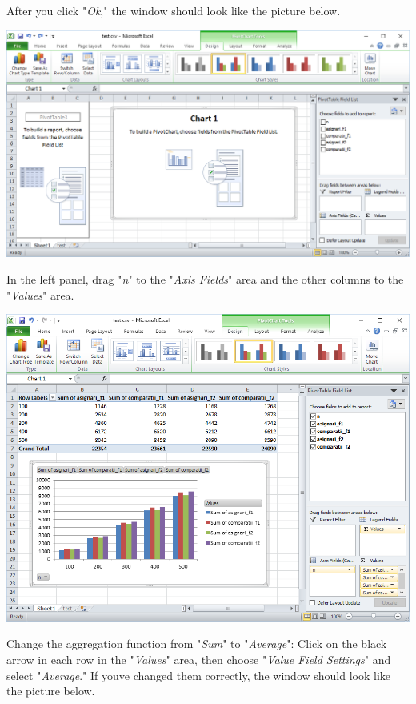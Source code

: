 \documentclass[../en-fa-lab.tex]{subfiles}
\begin{document}
After you click "\emph{Ok}," the window should look like the picture
below.

\includegraphics[width=\textwidth]{../Resources/lab0/image12.png}

In the left panel, drag "\emph{n}" to the "\emph{Axis Fields}" area and
the other columns to the "\emph{Values}" area.

\includegraphics[width=\textwidth]{../Resources/lab0/image13.png}

Change the aggregation function from "\emph{Sum}" to "\emph{Average}":
Click on the black arrow in each row in the "\emph{Values}" area, then
choose "\emph{Value Field Settings}" and select "\emph{Average}." If
you\textquotesingle ve changed them correctly, the window should look
like the picture below.
\end{document}
